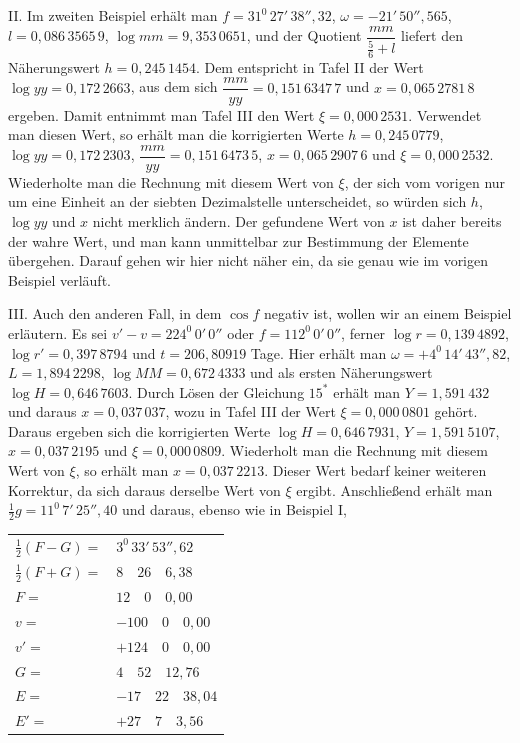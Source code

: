 II. Im zweiten Beispiel erhält man $f=31^0\,27'\,38''{,}32$, $\omega=-21'\,50''{,}565$, $l=0{,}086\,3565\,9$, $\log mm=9{,}353\,0651$, und der Quotient $\dfrac{mm}{\frac56+l}$ liefert den Näherungswert $h=0{,}245\,1454$. Dem entspricht in Tafel II der Wert $\log yy=0{,}172\,2663$, aus dem sich $\dfrac{mm}{yy}=0{,}151\,6347\,7$ und $x=0{,}065\,2781\,8$ ergeben. Damit entnimmt man Tafel III den Wert $\xi=0{,}000\,2531$. Verwendet man diesen Wert, so erhält man die korrigierten Werte $h=0{,}245\,0779$, $\log yy=0{,}172\,2303$, $\dfrac{mm}{yy}=0{,}151\,6473\,5$, $x=0{,}065\,2907\,6$ und $\xi=0{,}000\,2532$. Wiederholte man die Rechnung mit diesem Wert von $\xi$, der sich vom vorigen nur um eine Einheit an der siebten Dezimalstelle unterscheidet, so würden sich $h$, $\log yy$ und $x$ nicht merklich ändern. Der gefundene Wert von $x$ ist daher bereits der wahre Wert, und man kann unmittelbar zur Bestimmung der Elemente übergehen. Darauf gehen wir hier nicht näher ein, da sie genau wie im vorigen Beispiel verläuft.

III. Auch den anderen Fall, in dem $\cos f$ negativ ist, wollen wir an einem Beispiel erläutern. Es sei $v'-v=224^0\,0'\,0''$ oder $f=112^0\,0'\,0''$, ferner $\log r=0{,}139\,4892$, $\log r'=0{,}397\,8794$ und $t=206{,}80919$ Tage. Hier erhält man $\omega=+4^0\,14'\,43''{,}82$, $L=1{,}894\,2298$, $\log MM=0{,}672\,4333$ und als ersten Näherungswert $\log H=0{,}646\,7603$. Durch Lösen der Gleichung $15^*$ erhält man $Y=1{,}591\,432$ und daraus $x=0{,}037\,037$, wozu in Tafel III der Wert $\xi=0{,}000\,0801$ gehört. Daraus ergeben sich die korrigierten Werte $\log H=0{,}646\,7931$, $Y=1{,}591\,5107$, $x=0{,}037\,2195$ und $\xi=0{,}000\,0809$. Wiederholt man die Rechnung mit diesem Wert von $\xi$, so erhält man $x=0{,}037\,2213$. Dieser Wert bedarf keiner weiteren Korrektur, da sich daraus derselbe Wert von $\xi$ ergibt. Anschließend erhält man $\tfrac12 g=11^0\,7'\,25''{,}40$ und daraus, ebenso wie in Beispiel I,

\begin{center}
\begin{tabular}{@{}ll@{}}
$\tfrac12(F-G)=$ & $3^0\,33'\,53''{,}62$\\[.3em]
$\tfrac12(F+G)=$ & $8\quad26\quad6{,}38$\\[.3em]
$F=$ & $12\quad0\quad0{,}00$\\[.3em]
$v=$ & $-100\quad0\quad0{,}00$\\[.3em]
$v'=$ & $+124\quad0\quad0{,}00$\\[.3em]
$G=$ & $4\quad52\quad12{,}76$\\[.3em]
$E=$ & $-17\quad22\quad38{,}04$\\[.3em]
$E'=$ & $+27\quad7\quad3{,}56$\\[.3em]
\end{tabular}
\end{center}

